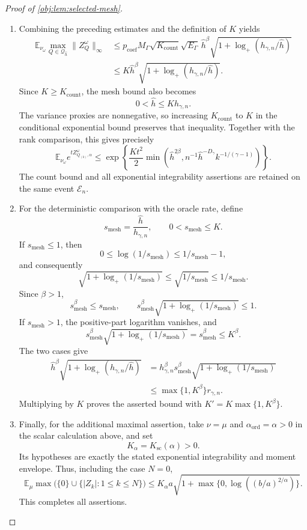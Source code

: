 \begin{proof}[Proof of \cref{obj:lem:selected-mesh}]
\begin{enumerate}
\item Combining the preceding estimates and the definition of \(K\)
yields
\[
\begin{aligned}
\mathbb E_{\nu_\omega}
\max_{Q\in\mathcal Q_{\widehat h}}\|Z_Q^\omega\|_\infty
&\le
p_{\mathrm{coef}}M_\Gamma
\sqrt{K_{\mathrm{count}}}\sqrt{E_\Gamma}\,
\widehat h^\beta
\sqrt{1+\log_+(h_{\gamma,n}/\widehat h)}\\
&\le
K\widehat h^\beta
\sqrt{1+\log_+(h_{\gamma,n}/\widehat h)}.
\end{aligned}
\]
Since \(K\ge K_{\mathrm{count}}\), the mesh bound also becomes
\[
0<\widehat h\le Kh_{\gamma,n}.
\]
The variance proxies are nonnegative, so increasing
\(K_{\mathrm{count}}\) to \(K\) in the conditional exponential bound
preserves that inequality. Together with the rank comparison, this
gives precisely
\[
\mathbb E_{\nu_\omega}e^{tZ_{Q_{(k)},\alpha}^\omega}
\le
\exp\!\left\{
\frac{Kt^2}{2}
\min\!\left(
\widehat h^{2\beta},
n^{-1}\widehat h^{-D_\gamma}k^{-1/(\gamma-1)}
\right)
\right\}.
\]
The count bound and all exponential integrability assertions are
retained on the same event \(\mathcal E_n\).

\item For the deterministic comparison with the oracle rate, define
\[
s_{\mathrm{mesh}}=\frac{\widehat h}{h_{\gamma,n}},
\qquad
0<s_{\mathrm{mesh}}\le K.
\]
If \(s_{\mathrm{mesh}}\le1\), then
\[
0\le\log(1/s_{\mathrm{mesh}})
\le1/s_{\mathrm{mesh}}-1,
\]
and consequently
\[
\sqrt{1+\log_+(1/s_{\mathrm{mesh}})}
\le\sqrt{1/s_{\mathrm{mesh}}}
\le1/s_{\mathrm{mesh}}.
\]
Since \(\beta>1\),
\[
s_{\mathrm{mesh}}^\beta\le s_{\mathrm{mesh}},
\qquad
s_{\mathrm{mesh}}^\beta
\sqrt{1+\log_+(1/s_{\mathrm{mesh}})}
\le1.
\]
If \(s_{\mathrm{mesh}}>1\), the positive-part logarithm vanishes, and
\[
s_{\mathrm{mesh}}^\beta
\sqrt{1+\log_+(1/s_{\mathrm{mesh}})}
=s_{\mathrm{mesh}}^\beta\le K^\beta.
\]
The two cases give
\[
\begin{aligned}
\widehat h^\beta
\sqrt{1+\log_+(h_{\gamma,n}/\widehat h)}
&=
h_{\gamma,n}^\beta s_{\mathrm{mesh}}^\beta
\sqrt{1+\log_+(1/s_{\mathrm{mesh}})}\\
&\le\max\{1,K^\beta\}r_{\gamma,n}.
\end{aligned}
\]
Multiplying by \(K\) proves the asserted bound with
\(K'=K\max\{1,K^\beta\}\).

\item Finally, for the additional maximal assertion, take
\(\nu=\mu\) and \(\alpha_{\mathrm{ord}}=\alpha>0\) in the scalar
calculation above, and set
\[
K_\alpha=K_{\mathrm{sc}}(\alpha)>0.
\]
Its hypotheses are exactly the stated exponential integrability and
moment envelope. Thus, including the case \(N=0\),
\[
\mathbb E_\mu
\max\bigl(\{0\}\cup\{|Z_k|:1\le k\le N\}\bigr)
\le
K_\alpha a
\sqrt{1+\max\{0,\log((b/a)^{2/\alpha})\}}.
\]
This completes all assertions.
\end{enumerate}
\end{proof}

